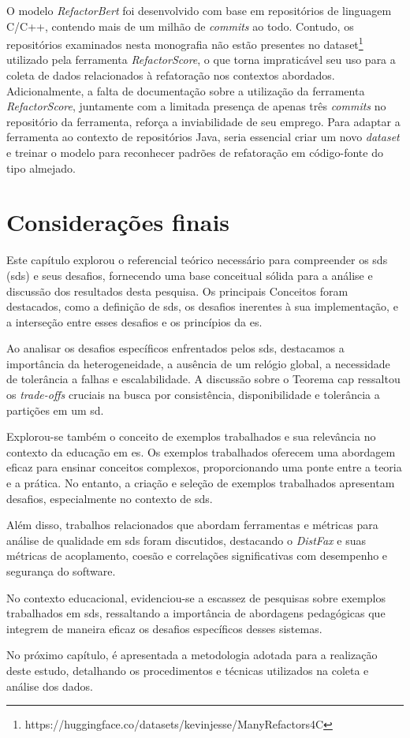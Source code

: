 O modelo \textit{RefactorBert} foi desenvolvido com base em repositórios de linguagem C/C++\cite{C_CppProgrammingLanguage}, contendo mais de um milhão de \textit{commits} ao todo. Contudo, os repositórios examinados nesta monografia não estão presentes no dataset\footnote{https://huggingface.co/datasets/kevinjesse/ManyRefactors4C} utilizado pela ferramenta \textit{RefactorScore}, o que torna impraticável seu uso para a coleta de dados relacionados à refatoração nos contextos abordados. Adicionalmente, a falta de documentação sobre a utilização da ferramenta \textit{RefactorScore}, juntamente com a limitada presença de apenas três \textit{commits} no repositório da ferramenta, reforça a inviabilidade de seu emprego. Para adaptar a ferramenta ao contexto de repositórios Java\cite{JavaProgrammingLanguage}, seria essencial criar um novo \textit{dataset} e treinar o modelo para reconhecer padrões de refatoração em código-fonte do tipo almejado.

\section{Considerações finais}
Este capítulo explorou o referencial teórico necessário para compreender os \gls{sds} (\gls{sds}) e seus desafios, fornecendo uma base conceitual sólida para a análise e discussão dos resultados desta pesquisa. Os principais Conceitos foram destacados, como a definição de \gls{sds}, os desafios inerentes à sua implementação, e a interseção entre esses desafios e os princípios da \gls{es}.

Ao analisar os desafios específicos enfrentados pelos \gls{sds}, destacamos a importância da heterogeneidade, a ausência de um relógio global, a necessidade de tolerância a falhas e escalabilidade. A discussão sobre o Teorema \gls{cap} ressaltou os \textit{trade-offs} cruciais na busca por consistência, disponibilidade e tolerância a partições em um \gls{sd}.

Explorou-se também o conceito de exemplos trabalhados e sua relevância no contexto da educação em \gls{es}. Os exemplos trabalhados oferecem uma abordagem eficaz para ensinar conceitos complexos, proporcionando uma ponte entre a teoria e a prática. No entanto, a criação e seleção de exemplos trabalhados apresentam desafios, especialmente no contexto de \gls{sds}.

Além disso, trabalhos relacionados que abordam ferramentas e métricas para análise de qualidade em \gls{sds} foram discutidos, destacando o \textit{DistFax} e suas métricas de acoplamento, coesão e correlações significativas com desempenho e segurança do software.

No contexto educacional, evidenciou-se a escassez de pesquisas sobre exemplos trabalhados em \gls{sds}, ressaltando a importância de abordagens pedagógicas que integrem de maneira eficaz os desafios específicos desses sistemas.

No próximo capítulo, é apresentada a metodologia adotada para a realização deste estudo, detalhando os procedimentos e técnicas utilizados na coleta e análise dos dados.
